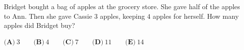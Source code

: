Bridget bought a bag of apples at the grocery store. She gave half of the apples to Ann. Then she gave Cassie $3$ apples, keeping $4$ apples for herself. How many apples did Bridget buy?

$\textbf{(A)}\ 3 \qquad \textbf{(B)}\ 4 \qquad \textbf{(C)}\ 7 \qquad \textbf{(D)}\ 11 \qquad \textbf{(E)}\ 14$
